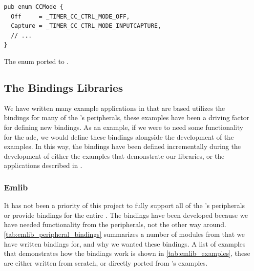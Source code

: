 \begin{listing}[h]
\begin{verbatim}
pub enum CCMode {
  Off     = _TIMER_CC_CTRL_MODE_OFF,
  Capture = _TIMER_CC_CTRL_MODE_INPUTCAPTURE,
  // ...
}
\end{verbatim}
\caption{The enum ported to {\rust}.}
\label{lst:enum_naming_rust}
\end{listing}

\subsection{The Bindings Libraries}
\label{ssub:the_bindings_library}

We have written many example applications in {\rust} that are based utilizes the bindings for many of the {\gecko}'s peripherals, these examples have been a driving factor for defining new bindings.
As an example, if we were to need some functionality for the \gls{adc}, we would define these bindings alongside the development of the examples.
In this way, the bindings have been defined incrementally during the development of either the examples that demonstrate our libraries, or the applications described in .

\subsubsection{Emlib}

It has not been a priority of this project to fully support all of the {\gecko}'s peripherals or provide bindings for the entire {\emlib}.
The bindings have been developed because we have needed functionality from the peripherals, not the other way around.
\autoref{tab:emlib_peripheral_bindings} summarizes a number of modules from {\emlib} that we have written bindings for, and why we wanted these bindings.
A list of examples that demonstrates how the bindings work is shown in \autoref{tab:emlib_examples}, these are either written from scratch, or directly ported from {\emlib}'s examples.

